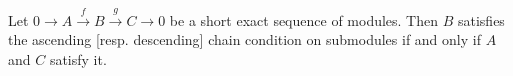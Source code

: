 Let \(0 \to A \xrightarrow{f} B \xrightarrow{g} C \to 0\) be a short exact sequence of modules. Then \(B\) satisfies the ascending [resp. descending] chain condition on submodules if and only if \(A\) and \(C\) satisfy it.
